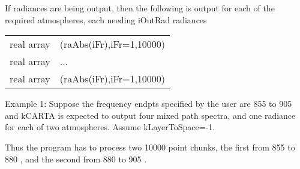 \documentclass[12pt]{article}
\newcommand{\kc}{\textsf{kCARTA}\xspace}
\newlength{\colwidth}
\begin{document}
{{{{\medskip
\noindent If radiances are being output, then the following is output 
for each of the required atmospheres, each needing iOutRad radiances \\
\begin{longtable}{lp{\colwidth}}
{\sf real array} & \indent (raAbs(iFr),iFr=1,10000)\\
{\sf real array} & \indent ...\\
{\sf real array} & \indent (raAbs(iFr),iFr=1,10000)\\
\end{longtable}

Example 1: Suppose the frequency endpts specified by the 
user are 855 to 905 \wn and \kc is expected to output four mixed path 
spectra, and one radiance for each of two atmospheres. Assume kLayerToSpace=-1.

Thus the program has to process two 10000 point chunks, the first from 
855 to 880 \wn, and the second from 880 to 905 \wn. 

}}}}
\end{document}
